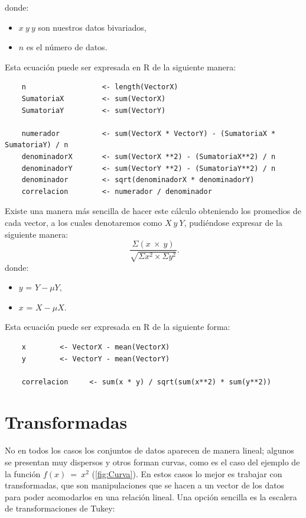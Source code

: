 \documentclass[]{article}
\begin{document}
donde:
\begin{itemize}
	\item $x\ y\ y$ son nuestros datos bivariados,
	\item $n$ es el número de datos.
\end{itemize}
Esta ecuación puede ser expresada en R de la siguiente manera:
  \begin{lstlisting}
    n                  <- length(VectorX)
    SumatoriaX         <- sum(VectorX)
    SumatoriaY         <- sum(VectorY)
    
    numerador          <- sum(VectorX * VectorY) - (SumatoriaX * SumatoriaY) / n
    denominadorX       <- sum(VectorX **2) - (SumatoriaX**2) / n
    denominadorY       <- sum(VectorY **2) - (SumatoriaY**2) / n
    denominador        <- sqrt(denominadorX * denominadorY)
    correlacion        <- numerador / denominador
   \end{lstlisting}

Existe una manera más sencilla de hacer este cálculo obteniendo los promedios de cada vector, a los cuales denotaremos como $X\ y\ Y$, pudiéndose expresar de la siguiente manera:
\[\ \frac{\Sigma\left(x\ \times\ y\right)}{\sqrt{\Sigma x^2\times\Sigma y^2}}.\]
donde:
\begin{itemize}
	\item $y$ = $Y - \mu Y$,
	\item $x$ = $X - \mu X$.

\end{itemize}
Esta ecuación puede ser expresada en R de la siguiente forma:
  \begin{lstlisting}
    x        <- VectorX - mean(VectorX)
    y        <- VectorY - mean(VectorY)
    
    correlacion     <- sum(x * y) / sqrt(sum(x**2) * sum(y**2))
   \end{lstlisting}

\section{Transformadas}

No en todos los casos los conjuntos de datos aparecen de manera lineal; algunos se presentan muy dispersos y otros forman curvas, como es el caso del ejemplo de la función $f\left(x\right)\ =\ x^2$ (\autoref{fig:Curva}). En estos casos lo mejor es trabajar con transformadas, que son manipulaciones que se hacen a un vector de los datos para poder acomodarlos en una relación lineal. Una opción sencilla es la escalera de transformaciones de Tukey:
\end{document}
